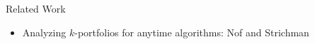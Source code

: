 \documentclass[en]{sdqbeamer}
\begin{document}
\begin{frame}[t]{Related Work}
\begin{itemize}
		\pause
		\vspace{\baselineskip}
		\item Analyzing $k$-portfolios for anytime algorithms: Nof and Strichman~\cite{nof2020real}
	\end{itemize}
\end{frame}
\end{document}
